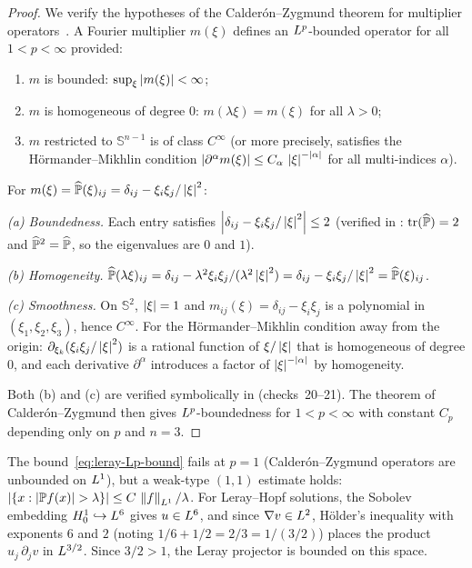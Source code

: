 \begin{proof}
  We verify the hypotheses of the Calder\'{o}n--Zygmund theorem for
  multiplier operators~\cite[Ch.\,II, \S4]{stein1970}.
  A Fourier multiplier $m(\xi)$ defines an $L^{p}$-bounded operator
  for all $1 < p < \infty$ provided:
  \begin{enumerate}[label=(\alph*)]
    \item $m$ is bounded: $\sup_\xi \left\lvert m(\xi) \right\rvert < \infty$;
    \item $m$ is homogeneous of degree $0$: $m(\lambda\xi) = m(\xi)$ for
      all $\lambda > 0$;
    \item $m$ restricted to $\mathbb{S}^{n-1}$ is of class $C^\infty$
      (or more precisely, satisfies the H\"{o}rmander--Mikhlin condition
      $\left\lvert \partial^\alpha m(\xi) \right\rvert \leq C_\alpha\,\left\lvert \xi \right\rvert^{-\left\lvert \alpha \right\rvert}$
      for all multi-indices $\alpha$).
  \end{enumerate}

  For $m(\xi) = \widehat{\mathbb{P}}(\xi)_{ij} = \delta_{ij} - \xi_i\xi_j/\left\lvert \xi \right\rvert^2$:

  \emph{(a) Boundedness.}
  Each entry satisfies $\left\lvert \delta_{ij} - \xi_i\xi_j/\left\lvert \xi \right\rvert^2 \right\rvert \leq 2$
  (verified in : $\operatorname{tr}(\widehat{\mathbb{P}}) = 2$
  and $\widehat{\mathbb{P}}^2 = \widehat{\mathbb{P}}$, so the eigenvalues are $0$
  and $1$).

  \emph{(b) Homogeneity.}
  $\widehat{\mathbb{P}}(\lambda\xi)_{ij}
  = \delta_{ij} - \lambda^2\xi_i\xi_j/(\lambda^2\left\lvert \xi \right\rvert^2)
  = \delta_{ij} - \xi_i\xi_j/\left\lvert \xi \right\rvert^2
  = \widehat{\mathbb{P}}(\xi)_{ij}$.

  \emph{(c) Smoothness.}
  On $\mathbb{S}^2$, $\left\lvert \xi \right\rvert = 1$ and $m_{ij}(\xi) = \delta_{ij} - \xi_i\xi_j$
  is a polynomial in $(\xi_1,\xi_2,\xi_3)$, hence $C^\infty$.
  For the H\"{o}rmander--Mikhlin condition away from the origin:
  $\partial_{\xi_k}(\xi_i\xi_j/\left\lvert \xi \right\rvert^2)$ is a rational function of
  $\xi/\left\lvert \xi \right\rvert$ that is homogeneous of degree $0$, and each derivative
  $\partial^\alpha$ introduces a factor of $\left\lvert \xi \right\rvert^{-\left\lvert \alpha \right\rvert}$ by
  homogeneity.

  Both (b) and (c) are verified symbolically in 
  (checks~20--21).  The theorem of Calder\'{o}n--Zygmund then gives
  $L^{p}$-boundedness for $1 < p < \infty$ with constant $C_p$ depending
  only on $p$ and $n = 3$.
\end{proof}

\begin{remark}[Endpoint $p = 1$]\label{rem:cz-endpoint}
  The bound~\eqref{eq:leray-Lp-bound} fails at $p = 1$ (Calder\'{o}n--Zygmund operators
  are unbounded on $L^{1}$), but a weak-type $(1,1)$ estimate holds:
  $\left\lvert \{x : \left\lvert \mathbb{P} f(x) \right\rvert > \lambda\} \right\rvert \leq C\,\left\lVert f \right\rVert_{L^{1}}/\lambda$.
  For Leray--Hopf solutions, the Sobolev embedding $H^{1}_0 \hookrightarrow L^{6}$
  gives $u \in L^{6}$, and since $\nabla v \in L^{2}$, H\"{o}lder's inequality with
  exponents $6$ and $2$ (noting $1/6 + 1/2 = 2/3 = 1/(3/2)$) places the product
  $u_j\,\partial_j v$ in $L^{3/2}$.  Since $3/2 > 1$, the Leray projector is bounded on
  this space.
\end{remark}

